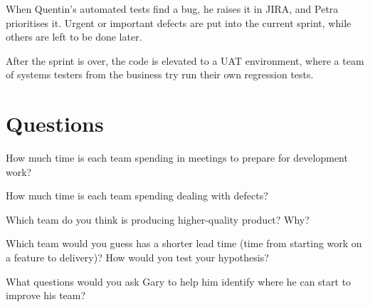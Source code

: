 When Quentin's automated tests find a bug, he raises it in JIRA, and Petra prioritises it. Urgent or important defects are put into the current sprint, while others are left to be done later.

After the sprint is over, the code is elevated to a UAT environment, where a team of systems testers from the business try run their own regression tests.

\newpage

\section*{Questions}

How much time is each team spending in meetings to prepare for development work?


How much time is each team spending dealing with defects?


Which team do you think is producing higher-quality product? Why?


Which team would you guess has a shorter lead time (time from starting work on a feature to delivery)? How would you test your hypothesis?


What questions would you ask Gary to help him identify where he can start to improve his team?

